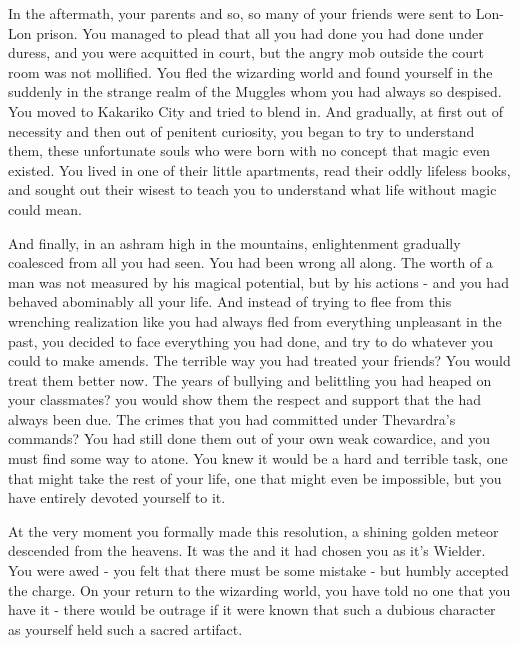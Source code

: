 \documentclass[char]{Katmeers}
\begin{document}
In the aftermath, your parents and so, so many of your friends were sent to Lon-Lon prison. You managed to plead that all you had done you had done under duress, and you were acquitted in court, but the angry mob outside the court room was not mollified. You fled the wizarding world and found yourself in the suddenly in the strange realm of the Muggles whom you had always so despised. You moved to Kakariko City and tried to blend in. And gradually, at first out of necessity and then out of penitent curiosity, you began to try to understand them, these unfortunate souls who were born with no concept that magic even existed. You lived in one of their little apartments, read their oddly lifeless books, and sought out their wisest to teach you to understand what life without magic could mean.

And finally, in an ashram high in the mountains, enlightenment gradually coalesced from all you had seen. You had been wrong all along. The worth of a man was not measured by his magical potential, but by his actions - and you had behaved abominably all your life. And instead of trying to flee from this wrenching realization like you had always fled from everything unpleasant in the past, you decided to face everything you had done, and try to do whatever you could to make amends. The terrible way you had treated your friends? You would treat them better now. The years of bullying and belittling you had heaped on your classmates? you would show them the respect and support that the had always been due. The crimes that you had committed under Thevardra's commands? You had still done them out of your own weak cowardice, and you must find some way to atone. You knew it would be a hard and terrible task, one that might take the rest of your life, one that might even be impossible, but you have entirely devoted yourself to it. 

At the very moment you formally made this resolution, a shining golden meteor descended from the heavens. It was the \iCourage{} and it had chosen you as it's Wielder. You were awed - you felt that there must be some mistake - but humbly accepted the charge. On your return to the wizarding world, you have told no one that you have it - there would be outrage if it were known that such a dubious character as yourself held such a sacred artifact.
\end{document}
